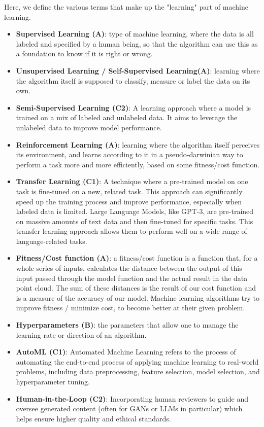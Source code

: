 \documentclass{article}
\begin{document}
Here, we define the various terms that make up the "learning" part of machine learning.

\begin{itemize}
    \item \textbf{Supervised Learning (A)}: type of machine learning, where the data is all labeled and specified by a human being, so that the algorithm can use this as a foundation to know if it is right or wrong.
    
    \item \textbf{Unsupervised Learning / Self-Supervised Learning(A)}: learning where the algorithm itself is supposed to classify, measure or label the data on its own.

    \item \textbf{Semi-Supervised Learning (C2)}: A learning approach where a model is trained on a mix of labeled and unlabeled data. It aims to leverage the unlabeled data to improve model performance.
    
    \item \textbf{Reinforcement Learning (A)}: learning where the algorithm itself perceives its environment, and learns according to it in a pseudo-darwinian way to perform a task more and more efficiently, based on some fitness/cost function.

    \item \textbf{Transfer Learning (C1)}: A technique where a pre-trained model on one task is fine-tuned on a new, related task. This approach can significantly speed up the training process and improve performance, especially when labeled data is limited. Large Language Models, like GPT-3, are pre-trained on massive amounts of text data and then fine-tuned for specific tasks. This transfer learning approach allows them to perform well on a wide range of language-related tasks.

    \item \textbf{Fitness/Cost function (A)}: a fitness/cost function is a function that, for a whole series of inputs, calculates the distance between the output of this input passed through the model function and the actual result in the data point cloud. The sum of these distances is the result of our cost function and is a measure of the accuracy of our model. Machine learning algorithms try to improve fitness / minimize cost, to become better at their given problem.
    
    \item \textbf{Hyperparameters (B)}: the parameters that allow one to manage the learning rate or direction of an algorithm.
    
    \item \textbf{AutoML (C1)}: Automated Machine Learning refers to the process of automating the end-to-end process of applying machine learning to real-world problems, including data preprocessing, feature selection, model selection, and hyperparameter tuning.

    \item \textbf{Human-in-the-Loop (C2)}: Incorporating human reviewers to guide and oversee generated content (often for GANs or LLMs in particular) which helps ensure higher quality and ethical standards.
\end{itemize}
\end{document}
